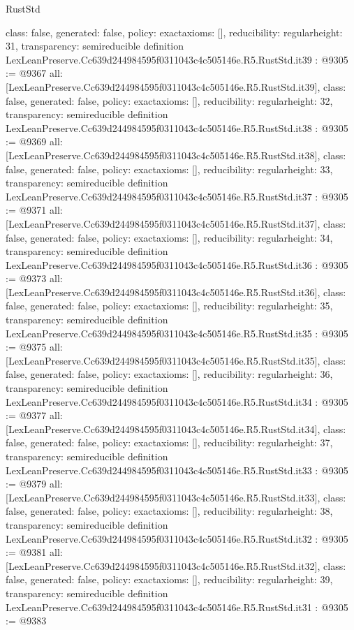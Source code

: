 \begin{lexlean}{RustStd}
\begin{coremodule}
{  class: false,
  generated: false,
  policy: exact{axioms: []},
  reducibility: regular{height: 31},
  transparency: semireducible
}
definition LexLeanPreserve.Cc639d244984595f0311043c4c505146e.R5.RustStd.it39 : @9305 := @9367 {
  all: [LexLeanPreserve.Cc639d244984595f0311043c4c505146e.R5.RustStd.it39],
  class: false,
  generated: false,
  policy: exact{axioms: []},
  reducibility: regular{height: 32},
  transparency: semireducible
}
definition LexLeanPreserve.Cc639d244984595f0311043c4c505146e.R5.RustStd.it38 : @9305 := @9369 {
  all: [LexLeanPreserve.Cc639d244984595f0311043c4c505146e.R5.RustStd.it38],
  class: false,
  generated: false,
  policy: exact{axioms: []},
  reducibility: regular{height: 33},
  transparency: semireducible
}
definition LexLeanPreserve.Cc639d244984595f0311043c4c505146e.R5.RustStd.it37 : @9305 := @9371 {
  all: [LexLeanPreserve.Cc639d244984595f0311043c4c505146e.R5.RustStd.it37],
  class: false,
  generated: false,
  policy: exact{axioms: []},
  reducibility: regular{height: 34},
  transparency: semireducible
}
definition LexLeanPreserve.Cc639d244984595f0311043c4c505146e.R5.RustStd.it36 : @9305 := @9373 {
  all: [LexLeanPreserve.Cc639d244984595f0311043c4c505146e.R5.RustStd.it36],
  class: false,
  generated: false,
  policy: exact{axioms: []},
  reducibility: regular{height: 35},
  transparency: semireducible
}
definition LexLeanPreserve.Cc639d244984595f0311043c4c505146e.R5.RustStd.it35 : @9305 := @9375 {
  all: [LexLeanPreserve.Cc639d244984595f0311043c4c505146e.R5.RustStd.it35],
  class: false,
  generated: false,
  policy: exact{axioms: []},
  reducibility: regular{height: 36},
  transparency: semireducible
}
definition LexLeanPreserve.Cc639d244984595f0311043c4c505146e.R5.RustStd.it34 : @9305 := @9377 {
  all: [LexLeanPreserve.Cc639d244984595f0311043c4c505146e.R5.RustStd.it34],
  class: false,
  generated: false,
  policy: exact{axioms: []},
  reducibility: regular{height: 37},
  transparency: semireducible
}
definition LexLeanPreserve.Cc639d244984595f0311043c4c505146e.R5.RustStd.it33 : @9305 := @9379 {
  all: [LexLeanPreserve.Cc639d244984595f0311043c4c505146e.R5.RustStd.it33],
  class: false,
  generated: false,
  policy: exact{axioms: []},
  reducibility: regular{height: 38},
  transparency: semireducible
}
definition LexLeanPreserve.Cc639d244984595f0311043c4c505146e.R5.RustStd.it32 : @9305 := @9381 {
  all: [LexLeanPreserve.Cc639d244984595f0311043c4c505146e.R5.RustStd.it32],
  class: false,
  generated: false,
  policy: exact{axioms: []},
  reducibility: regular{height: 39},
  transparency: semireducible
}
definition LexLeanPreserve.Cc639d244984595f0311043c4c505146e.R5.RustStd.it31 : @9305 := @9383 {
}
\end{coremodule}
\end{lexlean}
